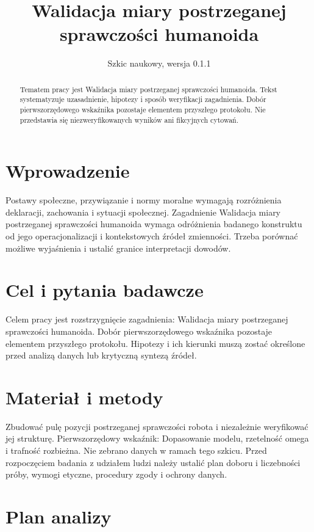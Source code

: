 \documentclass[11pt,a4paper]{article}
\title{Walidacja miary postrzeganej sprawczości humanoida}
\author{}
\date{Szkic naukowy, wersja 0.1.1}
\begin{document}
\maketitle

\begin{abstract}

Tematem pracy jest Walidacja miary postrzeganej sprawczości humanoida. Tekst systematyzuje uzasadnienie, hipotezy i sposób weryfikacji zagadnienia. Dobór pierwszorzędowego wskaźnika pozostaje elementem przyszłego protokołu. Nie przedstawia się niezweryfikowanych wyników ani fikcyjnych cytowań.

\end{abstract}

\section{Wprowadzenie}

Postawy społeczne, przywiązanie i normy moralne wymagają rozróżnienia deklaracji, zachowania i sytuacji społecznej. Zagadnienie Walidacja miary postrzeganej sprawczości humanoida wymaga odróżnienia badanego konstruktu od jego operacjonalizacji i kontekstowych źródeł zmienności. Trzeba porównać możliwe wyjaśnienia i ustalić granice interpretacji dowodów.

\section{Cel i pytania badawcze}

Celem pracy jest rozstrzygnięcie zagadnienia: Walidacja miary postrzeganej sprawczości humanoida. Dobór pierwszorzędowego wskaźnika pozostaje elementem przyszłego protokołu. Hipotezy i ich kierunki muszą zostać określone przed analizą danych lub krytyczną syntezą źródeł.

\section{Materiał i metody}

Zbudować pulę pozycji postrzeganej sprawczości robota i niezależnie weryfikować jej strukturę. Pierwszorzędowy wskaźnik: Dopasowanie modelu, rzetelność omega i trafność rozbieżna. Nie zebrano danych w ramach tego szkicu. Przed rozpoczęciem badania z udziałem ludzi należy ustalić plan doboru i liczebności próby, wymogi etyczne, procedury zgody i ochrony danych.

\section{Plan analizy}
\end{document}
